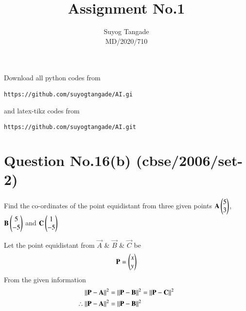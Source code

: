 \documentclass[journal,12pt,twocolumn]{IEEEtran}
\begin{document}
\def\rightbox#1{\makebox[0in][r]{#1}}
\def\centbox#1{\makebox[0in]{#1}}
\def\topbox#1{\raisebox{-\baselineskip}[0in][0in]{#1}}
\def\midbox#1{\raisebox{-0.5\baselineskip}[0in][0in]{#1}}
\vspace{3cm}
\title{Assignment No.1} 
\author{Suyog Tangade\\MD/2020/710} 
\maketitle
\newpage
\bigskip
\renewcommand{\thefigure}{\theenumi}
\renewcommand{\thetable}{\theenumi}
Download all python codes from
\begin{lstlisting}
https://github.com/suyogtangade/AI.gi
\end{lstlisting}
%
and latex-tikz codes from
%
\begin{lstlisting}
https://github.com/suyogtangade/AI.git
\end{lstlisting}
%
\section{Question No.16(b) (cbse/2006/set-2)}

Find the co-ordinates of the point equidistant from three given points $\mathbf{A}\begin{pmatrix}5\\3\end{pmatrix}$, $\mathbf{B}\begin{pmatrix}5\\-5\end{pmatrix}$ and $\mathbf{C}\begin{pmatrix}1\\-5\end{pmatrix}$ 
\solution

Let the point equidistant from $\Vec{A}$ \& $\Vec{B}$ \& $\Vec{C}$ be 
\begin{align}
    \Vec{P}=\myvec{x\\y}
\end{align}
From the given information 
\begin{align}\label{eq:1}
    \norm{\Vec{P}-\vec{A}}^2 &= \norm{\vec{P}-\vec{B}}^2 = \norm{\vec{P}-\vec{C}}^2\\
\therefore
    \norm{\Vec{P}-\vec{A}}^2 &= \norm{\vec{P}-\vec{B}}^2
\end{align}
\end{document}
